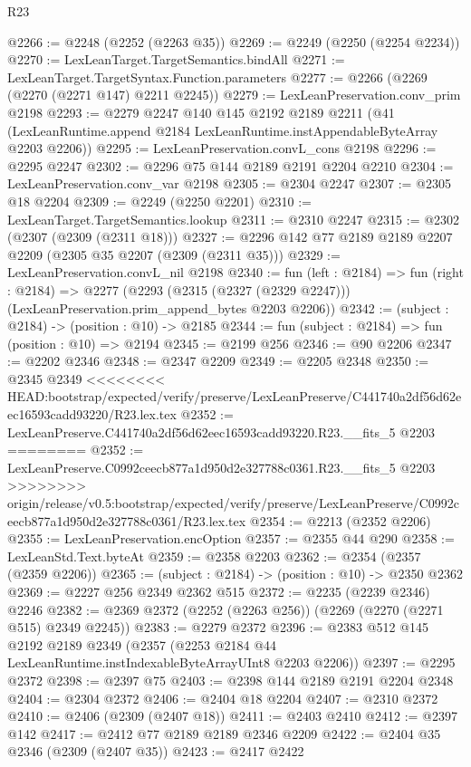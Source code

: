 \begin{lexlean}{R23}
\begin{coremodule}
{{{{{{{{{{{{{{{{{{{{{@2266 := @2248 (@2252 (@2263 @35))
@2269 := @2249 (@2250 (@2254 @2234))
@2270 := LexLeanTarget.TargetSemantics.bindAll
@2271 := LexLeanTarget.TargetSyntax.Function.parameters
@2277 := @2266 (@2269 (@2270 (@2271 @147) @2211 @2245))
@2279 := LexLeanPreservation.conv_prim @2198
@2293 := @2279
    @2247
    @140
    @145
    @2192
    @2189
    @2211
    (@41 (LexLeanRuntime.append @2184 LexLeanRuntime.instAppendableByteArray @2203 @2206))
@2295 := LexLeanPreservation.convL_cons @2198
@2296 := @2295 @2247
@2302 := @2296 @75 @144 @2189 @2191 @2204 @2210
@2304 := LexLeanPreservation.conv_var @2198
@2305 := @2304 @2247
@2307 := @2305 @18 @2204
@2309 := @2249 (@2250 @2201)
@2310 := LexLeanTarget.TargetSemantics.lookup
@2311 := @2310 @2247
@2315 := @2302 (@2307 (@2309 (@2311 @18)))
@2327 := @2296 @142 @77 @2189 @2189 @2207 @2209 (@2305 @35 @2207 (@2309 (@2311 @35)))
@2329 := LexLeanPreservation.convL_nil @2198
@2340 := fun (left : @2184) =>
  fun (right : @2184) =>
  @2277 (@2293 (@2315 (@2327 (@2329 @2247))) (LexLeanPreservation.prim_append_bytes @2203 @2206))
@2342 := (subject : @2184) -> (position : @10) -> @2185
@2344 := fun (subject : @2184) => fun (position : @10) => @2194
@2345 := @2199 @256
@2346 := @90 @2206
@2347 := @2202 @2346
@2348 := @2347 @2209
@2349 := @2205 @2348
@2350 := @2345 @2349
<<<<<<<< HEAD:bootstrap/expected/verify/preserve/LexLeanPreserve/C441740a2df56d62eec16593cadd93220/R23.lex.tex
@2352 := LexLeanPreserve.C441740a2df56d62eec16593cadd93220.R23.__fits_5 @2203
========
@2352 := LexLeanPreserve.C0992ceecb877a1d950d2e327788c0361.R23.__fits_5 @2203
>>>>>>>> origin/release/v0.5:bootstrap/expected/verify/preserve/LexLeanPreserve/C0992ceecb877a1d950d2e327788c0361/R23.lex.tex
@2354 := @2213 (@2352 @2206)
@2355 := LexLeanPreservation.encOption
@2357 := @2355 @44 @290
@2358 := LexLeanStd.Text.byteAt
@2359 := @2358 @2203
@2362 := @2354 (@2357 (@2359 @2206))
@2365 := (subject : @2184) -> (position : @10) -> @2350 @2362
@2369 := @2227 @256 @2349 @2362 @515
@2372 := @2235 (@2239 @2346) @2246
@2382 := @2369 @2372 (@2252 (@2263 @256)) (@2269 (@2270 (@2271 @515) @2349 @2245))
@2383 := @2279 @2372
@2396 := @2383
    @512
    @145
    @2192
    @2189
    @2349
    (@2357 (@2253 @2184 @44 LexLeanRuntime.instIndexableByteArrayUInt8 @2203 @2206))
@2397 := @2295 @2372
@2398 := @2397 @75
@2403 := @2398 @144 @2189 @2191 @2204 @2348
@2404 := @2304 @2372
@2406 := @2404 @18 @2204
@2407 := @2310 @2372
@2410 := @2406 (@2309 (@2407 @18))
@2411 := @2403 @2410
@2412 := @2397 @142
@2417 := @2412 @77 @2189 @2189 @2346 @2209
@2422 := @2404 @35 @2346 (@2309 (@2407 @35))
@2423 := @2417 @2422
}}}}}}}}}}}}}}}}}}}}}
\end{coremodule}
\end{lexlean}

